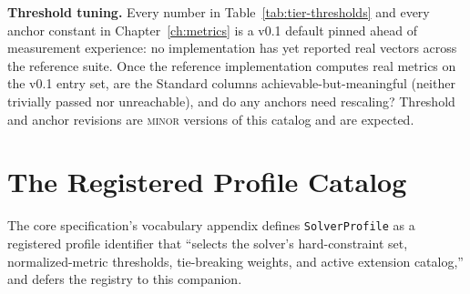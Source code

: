 \documentclass[11pt,letterpaper]{report}
\begin{document}
\begin{openquestion}
\textbf{Threshold tuning.} Every number in
Table~\ref{tab:tier-thresholds} and every anchor constant in
Chapter~\ref{ch:metrics} is a v0.1 default pinned ahead of measurement
experience: no implementation has yet reported real vectors across the
reference suite. Once the reference implementation computes real metrics
on the v0.1 entry set, are the Standard columns achievable-but-meaningful
(neither trivially passed nor unreachable), and do any anchors need
rescaling? Threshold and anchor revisions are \textsc{minor} versions of
this catalog and are expected.
\end{openquestion}

\chapter{The Registered Profile Catalog}
\label{ch:profiles}

The core specification's vocabulary appendix defines
\texttt{SolverProfile} as a registered profile identifier that ``selects
the solver's hard-constraint set, normalized-metric thresholds,
tie-breaking weights, and active extension catalog,'' and defers the
registry to this companion.
\end{document}
